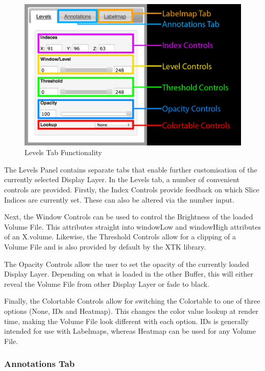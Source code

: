 \documentclass[a4paper,11pt,twoside]{article}
\begin{document}
\begin{figure}[ht!]
\centering
\includegraphics[width=140mm]{graphics/features_04.png}
\caption{Levels Tab Functionality}
\label{fig:UIdesign1}
\end{figure}

The Levels Panel contains separate tabs that enable further customisation of the currently selected Display Layer. In the Levels tab, a number of convenient controls are provided. Firstly, the Index Controls provide feedback on which Slice Indices are currently set. These can also be altered via the number input. 

Next, the Window Controls can be used to control the Brightness of the loaded Volume File. This attributes straight into windowLow and windowHigh attributes of an X.volume. Likewise, the Threshold Controls allow for a clipping of a Volume File and is also provided by default by the XTK library.

The Opacity Controls allow the user to set the opacity of the currently loaded Display Layer. Depending on what is loaded in the other Buffer, this will either reveal the Volume File from other Display Layer or fade to black.

Finally, the Colortable Controls allow for switching the Colortable to one of three options (None, IDs and Heatmap). This changes the color value lookup at render time, making the Volume File look different with each option. IDs is generally intended for use with Labelmaps, whereas Heatmap can be used for any Volume File.



\subsubsection{Annotations Tab}
\end{document}
